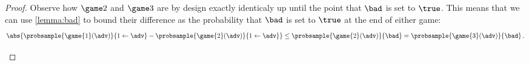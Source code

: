 \begin{proof}
      Observe how $\game 2$ and $\game 3$ are by design exactly identicaly
        up until the point that $\bad$ is set to $\true$. This means that we
        can use \cref{lemma:bad} to bound their difference as the probability
        that $\bad$ is set to $\true$ at the end of either game:
      \begin{align*}
        \abs{\probsample{ \game{1}(\adv) }{1 \gets \adv} 
          - \probsample{ \game{2}(\adv) }{1 \gets \adv}} \leq
          \probsample{\game{2}(\adv)}{\bad} = \probsample{\game{3}(\adv)}{\bad}\, . 
      \end{align*}

    \begin{figure}[t]
    	\begin{center}
\end{center}
\end{figure}
\end{proof}
